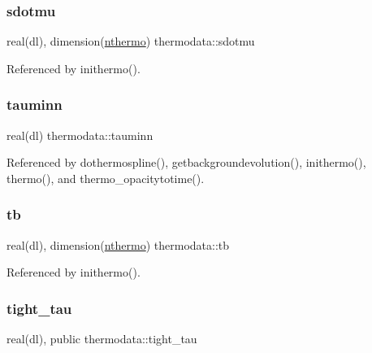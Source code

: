 \subsubsection{\texorpdfstring{sdotmu}{sdotmu}}
{\footnotesize\ttfamily real(dl), dimension(\mbox{\hyperlink{namespacethermodata_ab5a6325bede2b0cce4e867e9e1e18215}{nthermo}}) thermodata\+::sdotmu\hspace{0.3cm}{\ttfamily [private]}}



Referenced by inithermo().

\mbox{\label{namespacethermodata_a68569d7c6ff02b02a4025f86a42c0d7e}} 
\subsubsection{\texorpdfstring{tauminn}{tauminn}}
{\footnotesize\ttfamily real(dl) thermodata\+::tauminn\hspace{0.3cm}{\ttfamily [private]}}



Referenced by dothermospline(), getbackgroundevolution(), inithermo(), thermo(), and thermo\+\_\+opacitytotime().

\mbox{\label{namespacethermodata_ab667ebbdbb18924a862b09a4b328c7f2}} 
\subsubsection{\texorpdfstring{tb}{tb}}
{\footnotesize\ttfamily real(dl), dimension(\mbox{\hyperlink{namespacethermodata_ab5a6325bede2b0cce4e867e9e1e18215}{nthermo}}) thermodata\+::tb\hspace{0.3cm}{\ttfamily [private]}}



Referenced by inithermo().

\mbox{\label{namespacethermodata_acef8e1b2d18a8b07922432183d4673da}} 
\subsubsection{\texorpdfstring{tight\+\_\+tau}{tight\_tau}}
{\footnotesize\ttfamily real(dl), public thermodata\+::tight\+\_\+tau}



